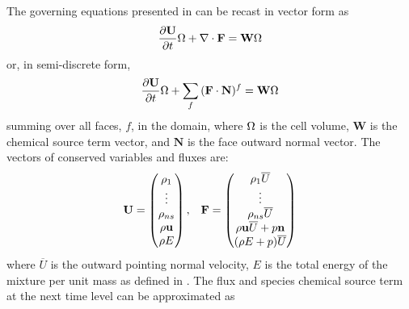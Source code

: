 The governing equations presented in  can
be recast in vector form as
\begin{equation}
	\label{inv_flux_vec}
  \frac{\partial \mathbf U}{\partial t}\Omega + \nabla \cdot \mathbf F = \mathbf W \Omega
\end{equation}
 or, in semi-discrete form,
\begin{equation}
	\label{inv_flux_fv}
  \frac{\partial \mathbf U}{\partial t}\Omega + \sum\limits_{f}^{}{(\mathbf F \cdot \mathbf{N})^f} = \mathbf W \Omega
 \end{equation}
summing over all faces, $f$, in the domain, where $\Omega$ is the cell volume, 
$\mathbf{W}$ is the chemical source term vector, and $\mathbf{N}$ is the face
outward normal vector.  The vectors of conserved variables and fluxes are:
\begin{equation}
	\begin{matrix}
	\mathbf{U}=\begin{pmatrix}
   		\rho_1\\
		\vdots \\
		\rho_{ns} \\
		\rho \mathbf u \\
		\rho E \\
	\end{pmatrix},      &
 	\mathbf{F} = \begin{pmatrix}
		\rho_1  \overline{U} \\
		\vdots \\
		\rho_{ns} \overline{U} \\
		\rho \mathbf u \overline{U} + p \mathbf{n}\\
		(\rho E + p) \overline{U} \\
	\end{pmatrix}
	\end{matrix}
  \label{fc-variables}
 \end{equation}
where $\overline{U}$ is the outward pointing normal velocity, $E$ is
the total energy of the mixture per unit mass as defined in
.  The flux and species chemical
source term at the next time level can be approximated as
